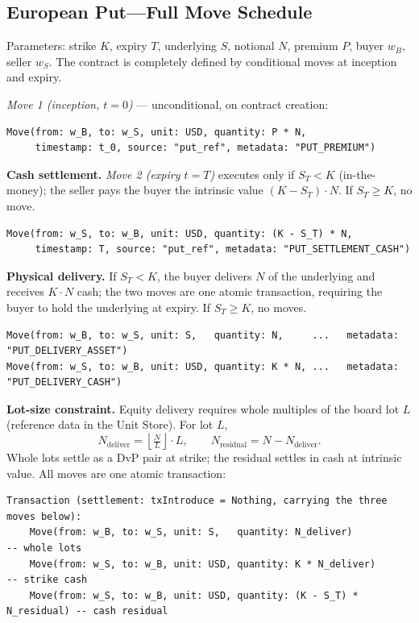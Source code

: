 \subsection{European Put---Full Move Schedule}

\noindent Parameters: strike $K$, expiry $T$, underlying $S$, notional $N$, premium $P$, buyer $w_B$, seller $w_S$. The contract is completely defined by conditional moves at inception and expiry.

\noindent\textit{Move 1 (inception, $t=0$)} --- unconditional, on contract creation:

\begin{lstlisting}
Move(from: w_B, to: w_S, unit: USD, quantity: P * N,
     timestamp: t_0, source: "put_ref", metadata: "PUT_PREMIUM")
\end{lstlisting}

\noindent\textbf{Cash settlement.} \textit{Move 2 (expiry $t=T$)} executes only if $S_T < K$ (in-the-money); the seller pays the buyer the intrinsic value $(K-S_T)\cdot N$. If $S_T \ge K$, no move.

\begin{lstlisting}
Move(from: w_S, to: w_B, unit: USD, quantity: (K - S_T) * N,
     timestamp: T, source: "put_ref", metadata: "PUT_SETTLEMENT_CASH")
\end{lstlisting}

\noindent\textbf{Physical delivery.} If $S_T < K$, the buyer delivers $N$ of the underlying and receives $K\cdot N$ cash; the two moves are one atomic transaction, requiring the buyer to hold the underlying at expiry. If $S_T \ge K$, no moves.

\begin{lstlisting}
Move(from: w_B, to: w_S, unit: S,   quantity: N,     ...   metadata: "PUT_DELIVERY_ASSET")
Move(from: w_S, to: w_B, unit: USD, quantity: K * N, ...   metadata: "PUT_DELIVERY_CASH")
\end{lstlisting}

\noindent\textbf{Lot-size constraint.} Equity delivery requires whole multiples of the board lot $L$ (reference data in the Unit Store). For lot $L$,
\[
N_{\text{deliver}} = \left\lfloor \tfrac{N}{L} \right\rfloor \cdot L, \qquad N_{\text{residual}} = N - N_{\text{deliver}}.
\]
Whole lots settle as a DvP pair at strike; the residual settles in cash at intrinsic value. All moves are one atomic transaction:

\begin{lstlisting}
Transaction (settlement: txIntroduce = Nothing, carrying the three moves below):
    Move(from: w_B, to: w_S, unit: S,   quantity: N_deliver)            -- whole lots
    Move(from: w_S, to: w_B, unit: USD, quantity: K * N_deliver)        -- strike cash
    Move(from: w_S, to: w_B, unit: USD, quantity: (K - S_T) * N_residual) -- cash residual
\end{lstlisting}

